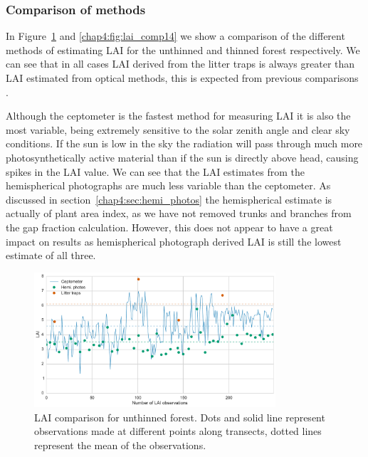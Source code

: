 \subsubsection{Comparison of methods} \label{chap4:sec:lai_comp}

In Figure~\ref{chap4:fig:lai_comp07} and \ref{chap4:fig:lai_comp14} we show a comparison of the different methods of estimating LAI for the unthinned and thinned forest respectively. We can see that in all cases LAI derived from the litter traps is always greater than LAI estimated from optical methods, this is expected from previous comparisons \citep{breda2003ground}.
 
Although the ceptometer is the fastest method for measuring LAI it is also the most variable, being extremely sensitive to the solar zenith angle and clear sky conditions. If the sun is low in the sky the radiation will pass through much more photosynthetically active material than if the sun is directly above head, causing spikes in the LAI value. We can see that the LAI estimates from the hemispherical photographs are much less variable than the ceptometer. As discussed in section~\ref{chap4:sec:hemi_photos} the hemispherical estimate is actually of plant area index, as we have not removed trunks and branches from the gap fraction calculation. However, this does not appear to have a great impact on results as hemispherical photograph derived LAI is still the lowest estimate of all three. 

\begin{figure}[ht]
    \centering
    \includegraphics[width=0.8\textwidth]{chapter/chapter4/thinned07.pdf}
    \caption{LAI comparison for unthinned forest. Dots and solid line represent observations made at different points along transects, dotted lines represent the mean of the observations.} \label{chap4:fig:lai_comp07}
\end{figure}

